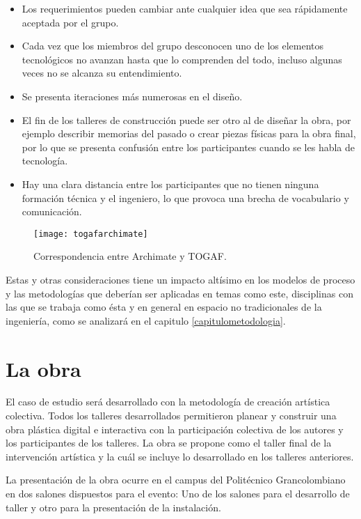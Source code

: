 \begin{itemize}
    \item Los requerimientos pueden cambiar ante cualquier idea que sea rápidamente aceptada por el grupo.
    \item Cada vez que los miembros del grupo desconocen uno de los elementos tecnológicos no avanzan hasta que lo comprenden del todo, incluso algunas veces no se alcanza su entendimiento.
    \item Se presenta iteraciones más numerosas en el diseño.
    \item El fin de los talleres de construcción puede ser otro al de diseñar la obra, por ejemplo describir memorias del pasado o crear piezas físicas para la obra final, por lo que se presenta confusión entre los participantes cuando se les habla de tecnología.
    \item Hay una clara distancia entre los participantes que no tienen ninguna formación técnica y el ingeniero, lo que provoca una brecha de vocabulario y comunicación.
\end{itemize}

\begin{figure}[h]\label{togafarchimate}
\centering
\texttt{[image: togafarchimate]}
\caption{Correspondencia entre Archimate y TOGAF.}
\end{figure}

Estas y otras consideraciones tiene un impacto altísimo en los modelos de proceso y las metodologías que deberían ser aplicadas en temas como este, disciplinas con las que se trabaja como ésta y en general en espacio no tradicionales de la ingeniería, como se analizará en el capitulo \ref{capitulometodologia}.

\section{La obra}

El caso de estudio será desarrollado con la metodología de creación artística colectiva\cite{casacuberta2003creacion}. Todos los talleres desarrollados permitieron planear y construir una obra plástica digital e interactiva con la participación colectiva de los autores y los participantes de los talleres. La obra se propone como el taller final de la intervención artística y la cuál se incluye lo desarrollado en los talleres anteriores.

La presentación de la obra ocurre en el campus del Politécnico Grancolombiano en dos salones dispuestos para el evento: Uno de los salones para el desarrollo de taller y otro para la presentación de la instalación.

